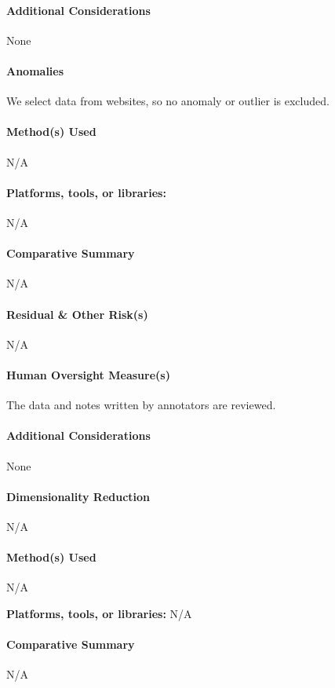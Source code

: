 \paragraph{Additional Considerations}
None

\paragraph{Anomalies}
We select data from websites, so no anomaly or outlier is excluded.

\paragraph{Method(s) Used}
N/A

\paragraph{Platforms, tools, or libraries:}
N/A

\paragraph{Comparative Summary}
N/A

\paragraph{Residual \& Other Risk(s)}
N/A

\paragraph{Human Oversight Measure(s)}
The data and notes written by annotators are reviewed.

\paragraph{Additional Considerations}
None

\paragraph{Dimensionality Reduction}
N/A

\paragraph{Method(s) Used}
N/A

\textbf{Platforms, tools, or libraries:}
N/A

\paragraph{Comparative Summary}
N/A

